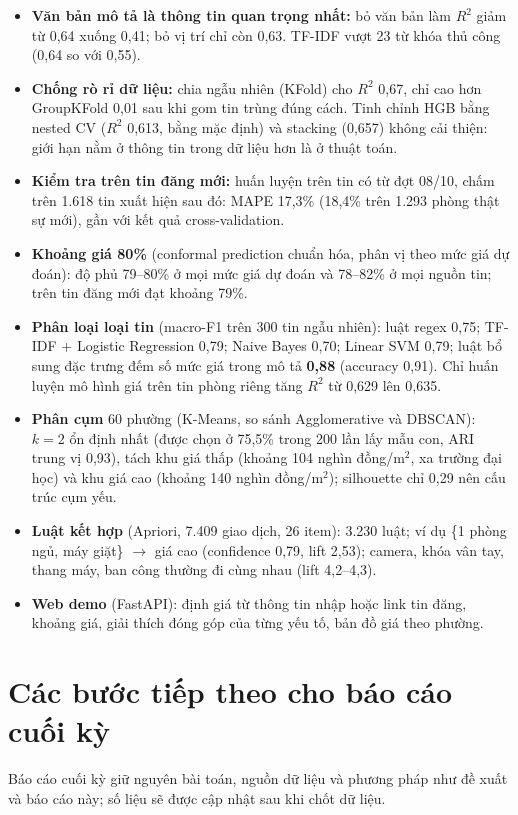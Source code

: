 \documentclass[11pt,a4paper]{article}
\begin{document}
\begin{itemize}
  \item \textbf{Văn bản mô tả là thông tin quan trọng nhất:} bỏ văn bản làm $R^2$ giảm từ 0,64 xuống 0,41; bỏ vị trí
        chỉ còn 0,63. TF-IDF vượt 23 từ khóa thủ công (0,64 so với 0,55).
  \item \textbf{Chống rò rỉ dữ liệu:} chia ngẫu nhiên (KFold) cho $R^2$ 0,67, chỉ cao hơn GroupKFold 0,01 sau khi gom tin
        trùng đúng cách. Tinh chỉnh HGB bằng nested CV ($R^2$ 0,613, bằng mặc định) và stacking (0,657) không cải thiện:
        giới hạn nằm ở thông tin trong dữ liệu hơn là ở thuật toán.
  \item \textbf{Kiểm tra trên tin đăng mới:} huấn luyện trên tin có từ đợt 08/10, chấm trên 1.618 tin xuất hiện sau đó:
        MAPE 17,3\% (18,4\% trên 1.293 phòng thật sự mới), gần với kết quả cross-validation.
  \item \textbf{Khoảng giá 80\%} (conformal prediction chuẩn hóa, phân vị theo mức giá dự đoán): độ phủ 79--80\% ở mọi mức
        giá dự đoán và 78--82\% ở mọi nguồn tin; trên tin đăng mới đạt khoảng 79\%.
  \item \textbf{Phân loại loại tin} (macro-F1 trên 300 tin ngẫu nhiên): luật regex 0,75; TF-IDF + Logistic Regression 0,79;
        Naive Bayes 0,70; Linear SVM 0,79; luật bổ sung đặc trưng đếm số mức giá trong mô tả \textbf{0,88}
        (accuracy 0,91). Chỉ huấn luyện mô hình giá trên tin phòng riêng tăng $R^2$ từ 0,629 lên 0,635.
  \item \textbf{Phân cụm} 60 phường (K-Means, so sánh Agglomerative và DBSCAN): $k=2$ ổn định nhất (được chọn ở 75,5\%
        trong 200 lần lấy mẫu con, ARI trung vị 0,93), tách khu giá thấp (khoảng 104 nghìn đồng/m$^2$, xa trường đại học)
        và khu giá cao (khoảng 140 nghìn đồng/m$^2$); silhouette chỉ 0,29 nên cấu trúc cụm yếu.
  \item \textbf{Luật kết hợp} (Apriori, 7.409 giao dịch, 26 item): 3.230 luật; ví dụ \{1 phòng ngủ, máy giặt\} $\rightarrow$
        giá cao (confidence 0,79, lift 2,53); camera, khóa vân tay, thang máy, ban công thường đi cùng nhau (lift 4,2--4,3).
  \item \textbf{Web demo} (FastAPI): định giá từ thông tin nhập hoặc link tin đăng, khoảng giá, giải thích đóng góp của
        từng yếu tố, bản đồ giá theo phường.
\end{itemize}

\section{Các bước tiếp theo cho báo cáo cuối kỳ}
Báo cáo cuối kỳ giữ nguyên bài toán, nguồn dữ liệu và phương pháp như đề xuất và báo cáo này; số liệu sẽ được cập nhật
sau khi chốt dữ liệu.
\end{document}

